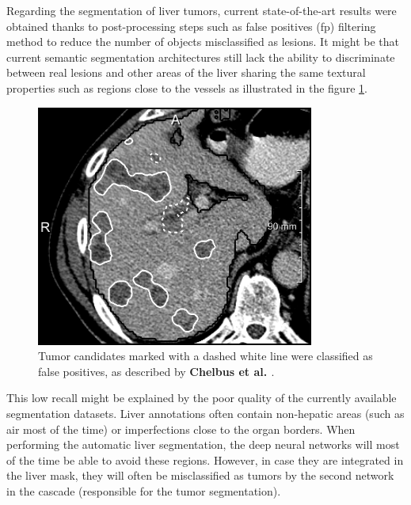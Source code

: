Regarding the segmentation of liver tumors, current state-of-the-art
results were obtained thanks to post-processing steps such as false
positives (\ac{fp}) filtering method to reduce the number of
objects misclassified as lesions.
It might be that current semantic segmentation architectures still lack the
ability to discriminate between real lesions and other areas of the liver sharing the
same textural properties such as regions close to the vessels as
illustrated in the figure \ref{fig:image5}.



\begin{figure}[th!]
\centering
\includegraphics[width=0.5\linewidth]{../Perspectives/images/chlebus}
\caption{Tumor candidates marked with a dashed white line were classified as false positives, as described by \textbf{Chelbus et al. \cite{Chlebus2018}}.}
\label{fig:image5}
\end{figure}

This low recall might be explained by the poor quality of the
currently available segmentation datasets. Liver annotations often
contain non-hepatic areas (such as air most of the time) or
imperfections close to the organ borders.
When performing the automatic liver segmentation, the deep neural
networks will most of the time be able to avoid these regions. However,
in case they are integrated in the liver mask, they will often be
misclassified as tumors by the second network in the cascade
(responsible for the tumor segmentation).

